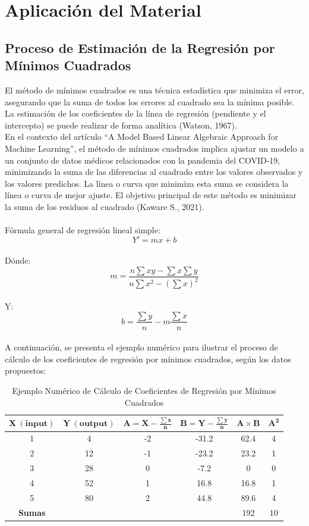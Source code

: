 \documentclass[]{article}
\begin{document}
\section{Aplicación del Material}
	\subsection{Proceso de Estimación de la Regresión por Mínimos Cuadrados}
	El método de mínimos cuadrados es una técnica estadística que minimiza el error, asegurando que la suma de todos los errores al cuadrado sea la mínima posible. La estimación de los coeficientes de la línea de regresión (pendiente y el intercepto) se puede realizar de forma analítica (Watson, 1967).\\
	En el contexto del artículo ``A Model Based Linear Algebraic Approach for Machine Learning'', el método de mínimos cuadrados implica ajustar un modelo a un conjunto de datos médicos relacionados con la pandemia del COVID-19, minimizando la suma de las diferencias al cuadrado entre los valores observados y los valores predichos. La línea o curva que minimiza esta suma se considera la línea o curva de mejor ajuste. El objetivo principal de este método es minimizar la suma de los residuos al cuadrado (Kaware S., 2021).\\
	\\
	Fórmula general de regresión lineal simple:
	\[
	 Y' = mx + b 
	\]
	\\
	Dónde:
	\[
	m = \frac{n \sum xy - \sum x \sum y}{n \sum x^{2} - (\sum x)^2}
	\]
	\\
	Y:
	\[
	b = \frac{\sum y}{n} - m \frac{\sum x}{n}
	\]
	\\
	A continuación, se presenta el ejemplo numérico para ilustrar el proceso de cálculo de los coeficientes de regresión por mínimos cuadrados, según los datos propuestos:\\
	
	\begin{table}[!h]
		\caption{Ejemplo Numérico de Cálculo de Coeficientes de Regresión por Mínimos Cuadrados}
		\begin{center}
			\begin{tabular}{|c|c|c|c|c|c|}
				\hline
				\(\mathbf{X\ (input)}\)\rule{0pt}{20pt} &
				\(\mathbf{Y\ (output)}\)\rule{0pt}{20pt} &
				\(\mathbf{A = X - \frac{\sum x}{n}}\)\rule{0pt}{20pt} &
				\(\mathbf{B = Y - \frac{\sum y}{n}}\)\rule{0pt}{20pt} &
				\(\mathbf{A \times B}\)\rule{0pt}{20pt} &
				\(\mathbf{A^2}\)\rule{0pt}{20pt} \\
				\hline
				1 & 4 & -2 & -31.2 & 62.4  & 4\\
				\hline
				2 & 12 & -1 & -23.2 & 23.2  & 1\\
				\hline
				3 & 28 & 0 & -7.2 & 0 & 0\\
				\hline
				4 & 52 & 1 & 16.8 & 16.8  & 1\\
				\hline
				5 & 80 & 2 & 44.8 & 89.6  & 4\\
				\hline
				\textbf{Sumas} &  &  &  & 192 & 10\\
				\hline
			\end{tabular}
			\label{tab:ejemplo}
		\end{center}
	\end{table}
	
\end{document}
